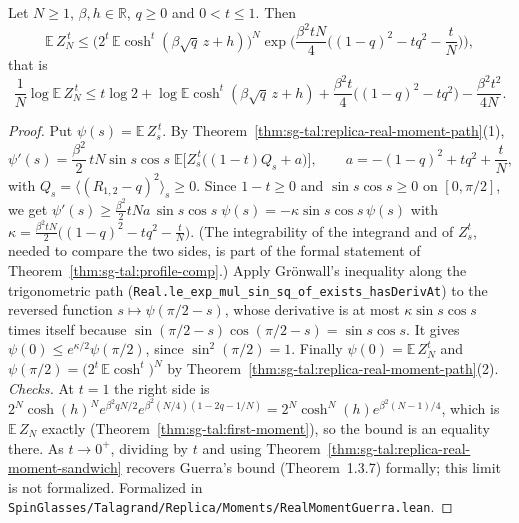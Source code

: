 \begin{theorem}\label{thm:sg-tal:replica-real-moment-guerra}
  \leanok
Let $N\ge1$, $\beta,h\in\mathbb R$, $q\ge0$ and $0<t\le1$. Then
\[
\mathbb E\,Z_N^{\,t}\le\Big(2^t\,\mathbb E\cosh^t(\beta\sqrt q\,z+h)\Big)^N
\exp\Big(\frac{\beta^2tN}4\Big((1-q)^2-tq^2-\frac tN\Big)\Big),
\]
that is
\[
\frac1N\log\mathbb E\,Z_N^{\,t}\le t\log2+\log\mathbb E\cosh^t(\beta\sqrt q\,z+h)+\frac{\beta^2t}4\big((1-q)^2-tq^2\big)-\frac{\beta^2t^2}{4N}.
\]
\end{theorem}
\begin{proof}
  \leanok
Put $\psi(s)=\mathbb E\,Z_s^{\,t}$. By Theorem~\ref{thm:sg-tal:replica-real-moment-path}(1),
\[
\psi'(s)=\frac{\beta^2}2\,tN\sin s\cos s\;\mathbb E\Big[Z_s^{\,t}\big((1-t)Q_s+a\big)\Big],\qquad a=-(1-q)^2+tq^2+\frac tN,
\]
with $Q_s=\langle(R_{1,2}-q)^2\rangle_s\ge0$. Since $1-t\ge0$ and $\sin s\cos s\ge0$ on $[0,\pi/2]$, we get $\psi'(s)\ge\frac{\beta^2}2tNa\,\sin s\cos s\;\psi(s)=-\kappa\sin s\cos s\,\psi(s)$ with $\kappa=\frac{\beta^2tN}2\big((1-q)^2-tq^2-\frac tN\big)$. (The integrability of the integrand and of $Z_s^t$, needed to compare the two sides, is part of the formal statement of Theorem~\ref{thm:sg-tal:profile-comp}.) Apply Gr\"onwall's inequality along the trigonometric path (\texttt{Real.le\_exp\_mul\_sin\_sq\_of\_exists\_hasDerivAt}) to the reversed function $s\mapsto\psi(\pi/2-s)$, whose derivative is at most $\kappa\sin s\cos s$ times itself because $\sin(\pi/2-s)\cos(\pi/2-s)=\sin s\cos s$. It gives $\psi(0)\le e^{\kappa/2}\psi(\pi/2)$, since $\sin^2(\pi/2)=1$. Finally $\psi(0)=\mathbb E\,Z_N^t$ and $\psi(\pi/2)=\big(2^t\,\mathbb E\cosh^t\big)^N$ by Theorem~\ref{thm:sg-tal:replica-real-moment-path}(2).
\emph{Checks.} At $t=1$ the right side is $2^N\cosh(h)^Ne^{\beta^2q N/2}e^{\beta^2(N/4)(1-2q-1/N)}=2^N\cosh^N(h)e^{\beta^2(N-1)/4}$, which is $\mathbb E\,Z_N$ exactly (Theorem~\ref{thm:sg-tal:first-moment}), so the bound is an equality there. As $t\to0^+$, dividing by $t$ and using Theorem~\ref{thm:sg-tal:replica-real-moment-sandwich} recovers Guerra's bound (Theorem~1.3.7) formally; this limit is not formalized.
Formalized in \texttt{SpinGlasses/Talagrand/Replica/Moments/RealMomentGuerra.lean}.
\end{proof}

